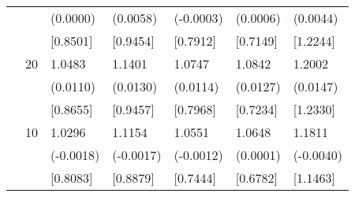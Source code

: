 \begin{table}[H]
{\begin{tabular}{c c | C{2.4cm} | C{2.4cm} | C{2.4cm} | C{2.4cm} | C{2.4cm} }
			&&(0.0000)&(0.0058)&(-0.0003)&(0.0006)&(0.0044)\\
			&&[0.8501]&[0.9454]&[0.7912]&[0.7149]&[1.2244]\\
			&20&1.0483&1.1401&1.0747&1.0842&1.2002\\
			&&(0.0110)&(0.0130)&(0.0114)&(0.0127)&(0.0147)\\
			&&[0.8655]&[0.9457]&[0.7968]&[0.7234]&[1.2330]\\
			&10&1.0296&1.1154&1.0551&1.0648&1.1811\\
			&&(-0.0018)&(-0.0017)&(-0.0012)&(0.0001)&(-0.0040)\\
			&&[0.8083]&[0.8879]&[0.7444]&[0.6782]&[1.1463]\\
			\bottomrule[1.5pt]
	\end{tabular}}
	\label{table:table S.5}
\end{table}

